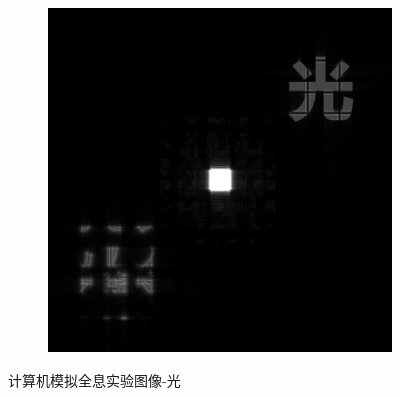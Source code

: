 \documentclass{ctexart}
\begin{document}
\begin{figure}[H]
\begin{subfigure}{.32\textwidth}
  \end{subfigure}
  \begin{subfigure}{.32\textwidth}
    \includegraphics[width=\linewidth]{数字全息实验数据/计算机模拟全息/用软件重建的结果图像/3-光-重建.jpg}
  \end{subfigure}
  \caption{计算机模拟全息实验图像-光}
\end{figure}
\end{document}
